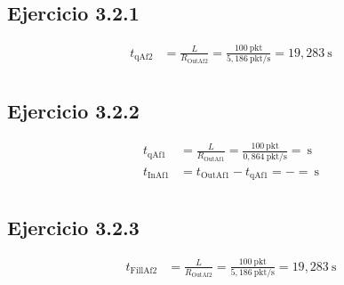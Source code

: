 \subsection{Ejercicio 3.2.1}
\[
    \begin{aligned}
        t_{\text{qAf2}} &= \frac{L}{R_{\text{OutAf2}}} = \frac{100~\text{pkt}}{5,186~\text{pkt/s}}= 19,283~\text{s} \\
    \end{aligned}
\]

\vspace{0,3cm}

\subsection{Ejercicio 3.2.2}
\[
    \begin{aligned}
        t_{\text{qAf1}} &= \frac{L}{R_{\text{OutAf1}}} = \frac{100~\text{pkt}}{0,864~\text{pkt/s}}= ~\text{s} \\
		t_{\text{InAf1}} &= t_{\text{OutAf1}} - t_{\text{qAf1}} = - = ~\text{s} \\
    \end{aligned}
\]

\vspace{0,3cm}

\subsection{Ejercicio 3.2.3}
\[
    \begin{aligned}
        t_{\text{FillAf2}} &= \frac{L}{R_{\text{OutAf2}}} = \frac{100~\text{pkt}}{5,186~\text{pkt/s}}= 19,283~\text{s} \\
    \end{aligned}
\]

